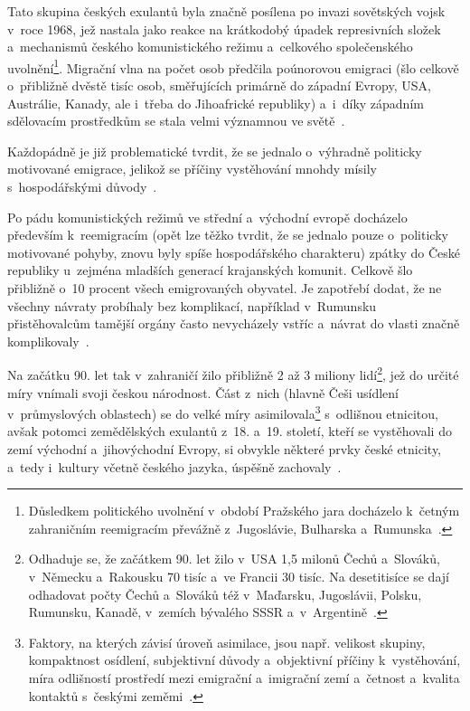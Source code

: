 Tato skupina českých exulantů byla značně posílena po invazi sovětských vojsk v~roce 1968, jež nastala jako reakce na krátkodobý úpadek represivních složek a~mechanismů českého komunistického režimu a~celkového společenského uvolnění\footnote{Důsledkem politického uvolnění v~období Pražského jara docházelo k~četným zahraničním reemigracím převážně z~Jugoslávie, Bulharska a~Rumunska~\parencite{Nespor2005}.}. Migrační vlna na počet osob předčila poúnorovou emigraci (šlo celkově o~přibližně dvěstě tisíc osob, směřujících primárně do západní Evropy, USA, Austrálie, Kanady, ale i~třeba do Jihoafrické republiky) a~i~díky západním sdělovacím prostředkům se stala velmi významnou ve světě~\parencite{Vaculik2002}.

Každopádně je již problematické tvrdit, že se jednalo o~výhradně politicky motivované emigrace, jelikož se příčiny vystěhování mnohdy mísily s~hospodářskými důvody~\parencite{Broucek2017}.

Po pádu komunistických režimů ve střední a~východní evropě docházelo především k~reemigracím (opět lze těžko tvrdit, že se jednalo pouze o~politicky motivované pohyby, znovu byly spíše hospodářského charakteru) zpátky do České republiky u~zejména mladších generací krajanských komunit. Celkově šlo přibližně o~10 procent všech emigrovaných obyvatel. Je zapotřebí dodat, že ne všechny návraty probíhaly bez komplikací, například v~Rumunsku přistěhovalcům tamější orgány často nevycházely vstříc a~návrat do vlasti značně komplikovaly~\parencite{Nespor2005}.

Na začátku 90. let tak v~zahraničí žilo přibližně 2 až 3 miliony lidí\footnote{Odhaduje se, že začátkem 90. let žilo v~USA 1,5 milonů Čechů a~Slováků, v~Německu a~Rakousku 70 tisíc a~ve Francii 30 tisíc. Na desetitisíce se dají odhadovat počty Čechů a~Slováků též v~Maďarsku, Jugoslávii, Polsku, Rumunsku, Kanadě, v~zemích bývalého SSSR a~v~Argentině~\parencite{Broucek2017}.}, jež do určité míry vnímali svoji českou národnost. Část z~nich (hlavně Češi usídlení v~průmyslových oblastech) se do velké míry asimilovala\footnote{Faktory, na kterých závisí úroveň asimilace, jsou např. velikost skupiny, kompaktnost osídlení, subjektivní důvody a~objektivní příčiny k~vystěhování, míra odlišností prostředí mezi emigrační a~imigrační zemí a~četnost a~kvalita kontaktů s~českými zeměmi~\parencite{Petrusek2017}.} s~odlišnou etnicitou, avšak potomci zemědělských exulantů z~18. a~19. století, kteří se vystěhovali do zemí východní a~jihovýchodní Evropy, si obvykle některé prvky české etnicity, a~tedy i~kultury včetně českého jazyka, úspěšně zachovaly~\parencite{Broucek2017}.

